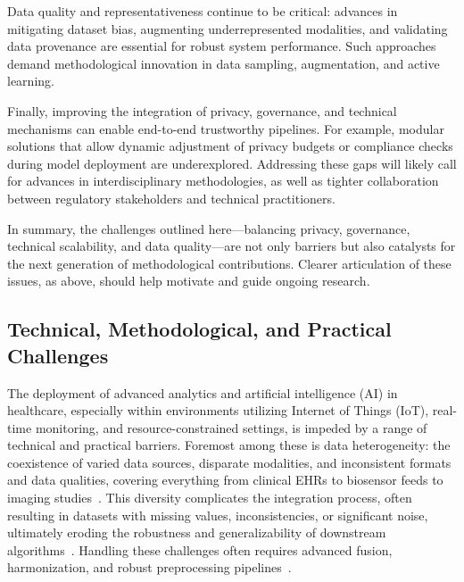 \documentclass[sigconf]{acmart}
\begin{document}
Data quality and representativeness continue to be critical: advances in mitigating dataset bias, augmenting underrepresented modalities, and validating data provenance are essential for robust system performance. Such approaches demand methodological innovation in data sampling, augmentation, and active learning.

Finally, improving the integration of privacy, governance, and technical mechanisms can enable end-to-end trustworthy pipelines. For example, modular solutions that allow dynamic adjustment of privacy budgets or compliance checks during model deployment are underexplored. Addressing these gaps will likely call for advances in interdisciplinary methodologies, as well as tighter collaboration between regulatory stakeholders and technical practitioners.

In summary, the challenges outlined here—balancing privacy, governance, technical scalability, and data quality—are not only barriers but also catalysts for the next generation of methodological contributions. Clearer articulation of these issues, as above, should help motivate and guide ongoing research.

\subsection{Technical, Methodological, and Practical Challenges}

The deployment of advanced analytics and artificial intelligence (AI) in healthcare, especially within environments utilizing Internet of Things (IoT), real-time monitoring, and resource-constrained settings, is impeded by a range of technical and practical barriers. Foremost among these is data heterogeneity: the coexistence of varied data sources, disparate modalities, and inconsistent formats and data qualities, covering everything from clinical EHRs to biosensor feeds to imaging studies~\cite{ref16,ref18,ref25,ref28,ref29,ref30,ref31,ref33,ref34,ref36,ref37,ref45,ref46,ref49,ref50,ref53,ref54,ref55,ref51,ref56,ref57,ref58,ref59,ref60,ref61,ref65,ref66,ref67,ref68,ref70,ref71,ref72,ref73,ref74,ref75,ref76,ref78,ref82,ref83,ref84,ref89,ref90,ref98,ref101,ref102,ref103,ref104,ref105,ref106,ref107}. This diversity complicates the integration process, often resulting in datasets with missing values, inconsistencies, or significant noise, ultimately eroding the robustness and generalizability of downstream algorithms~\cite{ref28,ref29,ref30,ref31,ref33,ref34,ref36,ref37,ref45,ref46,ref49,ref50,ref53,ref54,ref55,ref56,ref57,ref58,ref59,ref60,ref61,ref65,ref66,ref67,ref68,ref70,ref71,ref72,ref73,ref74,ref75,ref76,ref78,ref82,ref83,ref84,ref89,ref90,ref98,ref101,ref102,ref103,ref104,ref105,ref106,ref107}. Handling these challenges often requires advanced fusion, harmonization, and robust preprocessing pipelines~\cite{ref28,ref34,ref70,ref78}.
\end{document}
